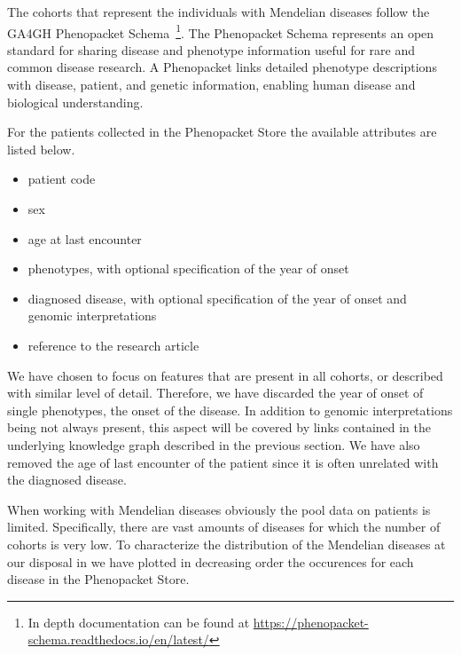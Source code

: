 The cohorts that represent the individuals with Mendelian diseases follow the GA4GH Phenopacket Schema~\cite{jacobsen2022ga4ghPhenopacketSchema}\footnote{In depth documentation can be found at \url{https://phenopacket-schema.readthedocs.io/en/latest/}}. The Phenopacket Schema represents an open standard for sharing disease and phenotype information useful for rare and common disease research. A Phenopacket links detailed phenotype descriptions with disease, patient, and genetic information, enabling human disease and biological understanding. 

For the patients collected in the Phenopacket Store the available attributes are listed below.
\begin{itemize}
  \item patient code
  \item sex
  \item age at last encounter
  \item phenotypes, with optional specification of the year of onset
  \item diagnosed disease, with optional specification of the year of onset and genomic interpretations
  \item reference to the research article
\end{itemize}

We have chosen to focus on features that are present in all cohorts, or described with similar level of detail. Therefore, we have discarded the year of onset of single phenotypes, the onset of the disease. In addition to genomic interpretations being not always present, this aspect will be covered by links contained in the underlying knowledge graph described in the previous section. We have also removed the age of last encounter of the patient since it is often unrelated with the diagnosed disease.

When working with Mendelian diseases obviously the pool data on patients is limited. Specifically, there are vast amounts of diseases for which the number of cohorts is very low. To characterize the distribution of the Mendelian diseases at our disposal in  we have plotted in decreasing order the occurences for each disease in the Phenopacket Store.


